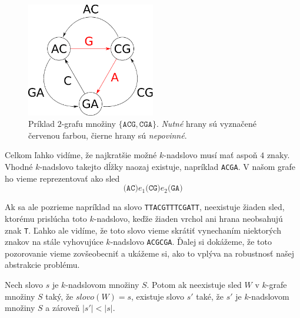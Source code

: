 \begin{figure}

\centerline{\includegraphics[width=0.5\textwidth]{images/graph-2-1-3.pdf}}

\caption[Príklad grafu]{Príklad $2$-grafu množiny $\{\texttt{ACG}, \texttt{CGA} \}$. \emph{Nutné} hrany sú vyznačené
červenou farbou, čierne hrany sú \emph{nepovinné}.}

\label{obr:graf}

\end{figure}

Celkom ľahko vidíme, že najkratšie možné $k$-nadslovo musí mať aspoň $4$ znaky. Vhodné $k$-nadslovo takejto
dĺžky naozaj existuje, napríklad \verb_ACGA_. V našom grafe ho vieme reprezentovať ako sled
$$\texttt{(AC)} e_1 \texttt{(CG)} e_2 \texttt{(GA)}$$

Ak sa ale pozrieme napríklad na slovo \verb_TTACGTTTCGATT_, neexistuje žiaden sled, ktorému prislúcha toto $k$-nadslovo,
keďže žiaden vrchol ani hrana neobsahujú znak \verb_T_. Ľahko ale vidíme, že toto slovo vieme skrátiť
vynechaním niektorých znakov na stále vyhovujúce $k$-nadslovo \verb_ACGCGA_. Ďalej si dokážeme, že toto 
pozorovanie vieme zovšeobecniť a ukážeme si, ako to vplýva na robustnosť našej abstrakcie problému.

\begin{veta}
Nech slovo $s$ je $k$-nadslovom množiny $S$. Potom ak neexistuje sled $W$ v $k$-grafe množiny $S$ taký, že
$slovo(W) = s$, existuje slovo $s'$ také, že $s'$ je $k$-nadslovom množiny $S$ a zároveň $|s'| < |s|$.
\end{veta}

